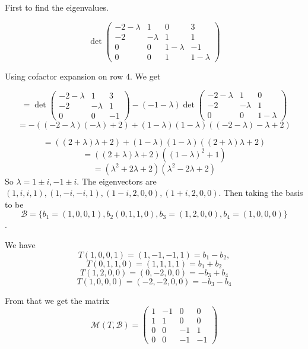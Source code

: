 \documentclass[letter,12pt]{article}
\newcommand{\Mat}{\mathcal{M}}
\begin{document}
First to find the eigenvalues. 

\[
\det\begin{pmatrix}
    -2-\lambda & 1 & 0 & 3\\
    -2 & -\lambda & 1 & 1\\
    0 & 0 & 1-\lambda & -1\\
    0 & 0 & 1 & 1-\lambda
\end{pmatrix}    
\]

Using  cofactor expansion on row $4$. We get 

$$
=\det\begin{pmatrix}
    -2-\lambda & 1 & 3\\
    -2 & -\lambda & 1\\
    0 & 0 & -1
\end{pmatrix}
-(-1-\lambda)\det\begin{pmatrix}
    -2-\lambda & 1 & 0\\
    -2 & -\lambda & 1\\
    0 & 0 & 1-\lambda
\end{pmatrix}$$
$$= -((-2-\lambda)(-\lambda)+2)+(1-\lambda)(1-\lambda)((-2-\lambda)-\lambda+2)$$

$$=((2+\lambda)\lambda +2)+(1-\lambda)(1-\lambda)((2+\lambda)\lambda+2)$$
$$=((2+\lambda)\lambda+2)((1-\lambda)^2+1)$$
$$=(\lambda^2+2\lambda+2)(\lambda^2-2\lambda+2)$$
So $\lambda=1\pm i,-1\pm i$. The eigenvectors are $(1,i,i,1),(1,-i,-i,1),(1-i,2,0,0),(1+i,2,0,0)$. Then taking the basis to be $$\mathcal B=\{b_1=(1,0,0,1),b_2(0,1,1,0),b_3=(1,2,0,0),b_4=(1,0,0,0)\}$$.

We have $$T(1,0,0,1)=(1,-1,-1,1)=b_1-b_2,$$
$$T(0,1,1,0)=(1,1,1,1)=b_1+b_2$$
$$T(1,2,0,0)=(0,-2,0,0)=-b_3+b_4$$
$$T(1,0,0,0)=(-2,-2,0,0)=-b_3-b_4$$

From that we get the matrix $$\Mat(T,\mathcal B)=\begin{pmatrix}
    1 & -1 &0 & 0 \\
    1 & 1& 0& 0\\
    0 & 0 & -1 & 1\\
    0 & 0 & -1 & -1
\end{pmatrix}$$
\end{document}
